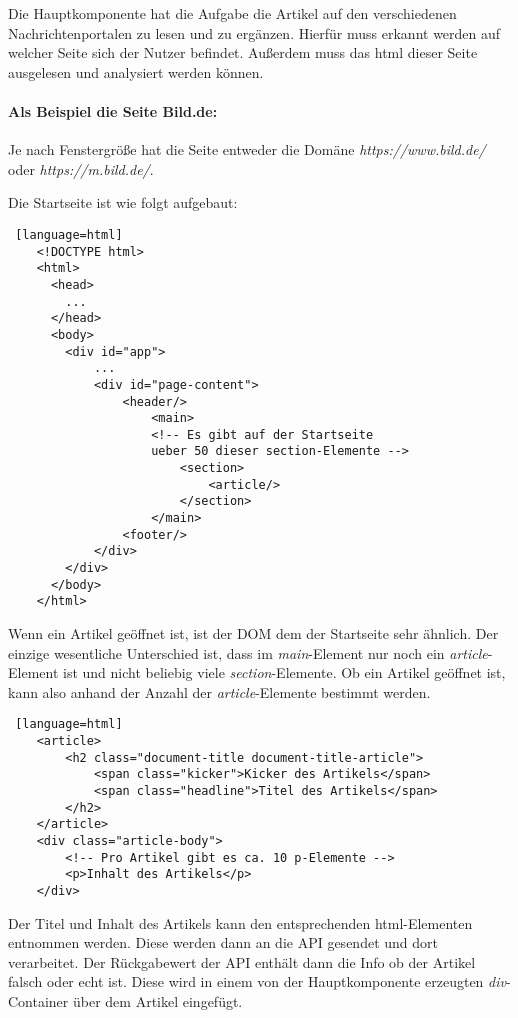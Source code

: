 Die Hauptkomponente hat die Aufgabe die Artikel auf den verschiedenen Nachrichtenportalen zu lesen und zu ergänzen.
Hierfür muss erkannt werden auf welcher Seite sich der Nutzer befindet. Außerdem muss das html dieser Seite ausgelesen und analysiert werden können.

\paragraph{Als Beispiel die Seite Bild.de:} 
Je nach Fenstergröße hat die Seite entweder die Domäne \textit{https://www.bild.de/} oder \textit{https://m.bild.de/}.

Die Startseite ist wie folgt aufgebaut:

\begin{lstlisting} [language=html]
    <!DOCTYPE html>
    <html>
      <head>
        ...
      </head>
      <body>
        <div id="app">
            ...
            <div id="page-content">
                <header/>
                    <main>
                    <!-- Es gibt auf der Startseite 
                    ueber 50 dieser section-Elemente -->
                        <section>
                            <article/>
                        </section>
                    </main>
                <footer/>
            </div>    
        </div>
      </body>
    </html>
\end{lstlisting}

Wenn ein Artikel geöffnet ist, ist der DOM dem der Startseite sehr ähnlich. Der einzige wesentliche Unterschied ist, dass im \textit{main}-Element
nur noch ein \textit{article}-Element ist und nicht beliebig viele \textit{section}-Elemente.
Ob ein Artikel geöffnet ist, kann also anhand der Anzahl der \textit{article}-Elemente bestimmt werden.

\begin{lstlisting} [language=html]
    <article>
        <h2 class="document-title document-title-article">
            <span class="kicker">Kicker des Artikels</span>
            <span class="headline">Titel des Artikels</span>
        </h2>
    </article>
    <div class="article-body">
        <!-- Pro Artikel gibt es ca. 10 p-Elemente -->
        <p>Inhalt des Artikels</p>
    </div>
\end{lstlisting}

Der Titel und Inhalt des Artikels kann den entsprechenden html-Elementen entnommen werden.
Diese werden dann an die API gesendet und dort verarbeitet. 
Der Rückgabewert der API enthält dann die Info ob der Artikel falsch oder echt ist.
Diese wird in einem von der Hauptkomponente erzeugten \textit{div}-Container über dem Artikel eingefügt.

